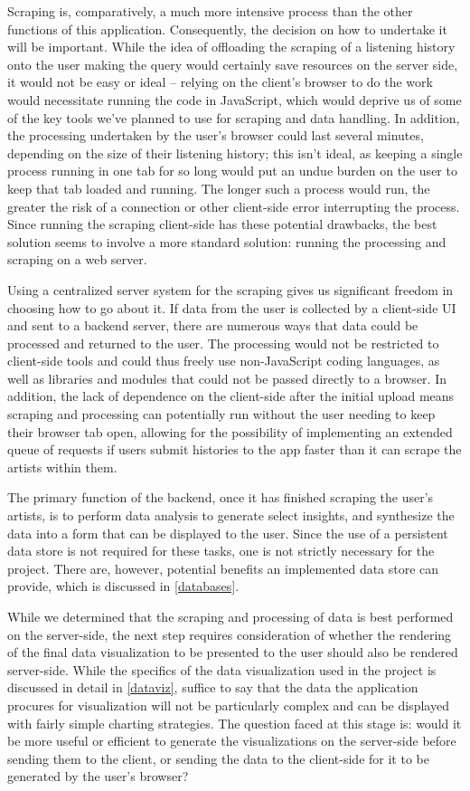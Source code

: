 Scraping is, comparatively, a much more intensive process than the other functions of this application. Consequently, the decision on how to undertake it will be important. While the idea of offloading the scraping of a listening history onto the user making the query would certainly save resources on the server side, it would not be easy or ideal -- relying on the client's browser to do the work would necessitate running the code in JavaScript, which would deprive us of some of the key tools we've planned to use for scraping and data handling. In addition, the processing undertaken by the user's browser could last several minutes, depending on the size of their listening history; this isn't ideal, as keeping a single process running in one tab for so long would put an undue burden on the user to keep that tab loaded and running. The longer such a process would run, the greater the risk of a connection or other client-side error interrupting the process. Since running the scraping client-side has these potential drawbacks, the best solution seems to involve a more standard solution: running the processing and scraping on a web server.

Using a centralized server system for the scraping gives us significant freedom in choosing how to go about it. If data from the user is collected by a client-side UI and sent to a backend server, there are numerous ways that data could be processed and returned to the user. The processing would not be restricted to client-side tools and could thus freely use non-JavaScript coding languages, as well as libraries and modules that could not be passed directly to a browser. In addition, the lack of dependence on the client-side after the initial upload means scraping and processing can potentially run without the user needing to keep their browser tab open, allowing for the possibility of implementing an extended queue of requests if users submit histories to the app faster than it can scrape the artists within them.

The primary function of the backend, once it has finished scraping the user's artists, is to perform data analysis to generate select insights, and synthesize the data into a form that can be displayed to the user. Since the use of a persistent data store is not required for these tasks, one is not strictly necessary for the project. There are, however, potential benefits an implemented data store can provide, which is discussed in \autoref{databases}.

While we determined that the scraping and processing of data is best performed on the server-side, the next step requires consideration of whether the rendering of the final data visualization to be presented to the user should also be rendered server-side. While the specifics of the data visualization used in the project is discussed in detail in \autoref{dataviz}, suffice to say that the data the application procures for visualization will not be particularly complex and can be displayed with fairly simple charting strategies. The question faced at this stage is: would it be more useful or efficient to generate the visualizations on the server-side before sending them to the client, or sending the data to the client-side for it to be generated by the user's browser?

